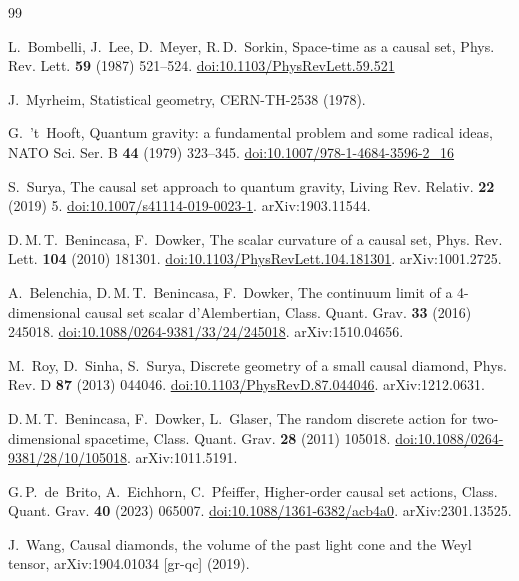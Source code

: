 \documentclass[12pt,a4paper]{article}
\theoremstyle{plain}
\theoremstyle{definition}
\theoremstyle{remark}
\begin{document}
\begin{thebibliography}{99}

L.~Bombelli, J.~Lee, D.~Meyer, R.\,D.~Sorkin,
Space-time as a causal set,
Phys. Rev. Lett. \textbf{59} (1987) 521--524.
\href{https://doi.org/10.1103/PhysRevLett.59.521}{doi:10.1103/PhysRevLett.59.521}

J.~Myrheim,
Statistical geometry,
CERN-TH-2538 (1978).

G.~'t~Hooft,
Quantum gravity: a fundamental problem and some radical ideas,
NATO Sci. Ser. B \textbf{44} (1979) 323--345.
\href{https://doi.org/10.1007/978-1-4684-3596-2_16}{doi:10.1007/978-1-4684-3596-2\_16}

S.~Surya,
The causal set approach to quantum gravity,
Living Rev. Relativ. \textbf{22} (2019) 5.
\href{https://doi.org/10.1007/s41114-019-0023-1}{doi:10.1007/s41114-019-0023-1}.
arXiv:1903.11544.

D.\,M.\,T.~Benincasa, F.~Dowker,
The scalar curvature of a causal set,
Phys. Rev. Lett. \textbf{104} (2010) 181301.
\href{https://doi.org/10.1103/PhysRevLett.104.181301}{doi:10.1103/PhysRevLett.104.181301}.
arXiv:1001.2725.

A.~Belenchia, D.\,M.\,T.~Benincasa, F.~Dowker,
The continuum limit of a 4-dimensional causal set scalar d'Alembertian,
Class. Quant. Grav. \textbf{33} (2016) 245018.
\href{https://doi.org/10.1088/0264-9381/33/24/245018}{doi:10.1088/0264-9381/33/24/245018}.
arXiv:1510.04656.

M.~Roy, D.~Sinha, S.~Surya,
Discrete geometry of a small causal diamond,
Phys. Rev. D \textbf{87} (2013) 044046.
\href{https://doi.org/10.1103/PhysRevD.87.044046}{doi:10.1103/PhysRevD.87.044046}.
arXiv:1212.0631.

D.\,M.\,T.~Benincasa, F.~Dowker, L.~Glaser,
The random discrete action for two-dimensional spacetime,
Class. Quant. Grav. \textbf{28} (2011) 105018.
\href{https://doi.org/10.1088/0264-9381/28/10/105018}{doi:10.1088/0264-9381/28/10/105018}.
arXiv:1011.5191.

G.\,P.~de~Brito, A.~Eichhorn, C.~Pfeiffer,
Higher-order causal set actions,
Class. Quant. Grav. \textbf{40} (2023) 065007.
\href{https://doi.org/10.1088/1361-6382/acb4a0}{doi:10.1088/1361-6382/acb4a0}.
arXiv:2301.13525.

J.~Wang,
Causal diamonds, the volume of the past light cone and the Weyl tensor,
arXiv:1904.01034 [gr-qc] (2019).


\end{thebibliography}
\end{document}
